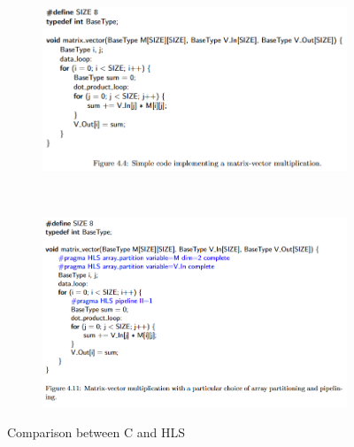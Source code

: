 \documentclass[12pt]{article}
\begin{document}
	\begin{figure}[h!]
		\begin{subfigure}{.5\textwidth}
			\centering
			\includegraphics[height=\linewidth]{figures/code1.png}
			\caption{}
		\end{subfigure}%
		\\
		\begin{subfigure}{.5\textwidth}
			\centering
			\includegraphics[height=\linewidth]{figures/code2.png}
			\caption{}
		\end{subfigure}%
		\caption{Comparison between C and HLS}
		\label{fig:code}
	\end{figure}
	
\end{document}
